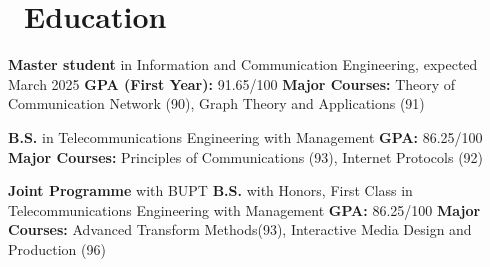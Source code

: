 \documentclass{resume}
\begin{document}



\section{\faGraduationCap\ Education}
\textbf{Master student} in Information and Communication Engineering, expected March 2025 \newline
\textbf{GPA (First Year):} 91.65/100 \newline
\textbf{Major Courses:} Theory of Communication Network (90), Graph Theory and Applications (91)

\textbf{B.S.} in Telecommunications Engineering with Management \newline
\textbf{GPA:} 86.25/100 \newline
\textbf{Major Courses:} Principles of Communications (93), Internet Protocols (92)

\textbf{Joint Programme} with BUPT \newline
\textbf{B.S.} with Honors, First Class in Telecommunications Engineering with Management \newline
\textbf{GPA:} 86.25/100 \newline
\textbf{Major Courses:} Advanced Transform Methods(93), Interactive Media Design and Production (96)
\end{document}
